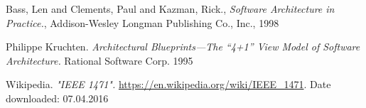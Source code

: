 \begin{thebibliography}{}

    {Bass, Len and Clements, Paul and Kazman, Rick.}, \emph{Software Architecture in Practice.},
    Addison-Wesley Longman Publishing Co., Inc.,
    1998

    Philippe Kruchten.
    \emph{Architectural Blueprints—The “4+1” View Model of Software Architecture.}
    Rational Software Corp.
    1995
    
    Wikipedia.
    \emph{"IEEE 1471".}
    \url{https://en.wikipedia.org/wiki/IEEE_1471}.
    Date downloaded: 07.04.2016
    
    
\end{thebibliography}